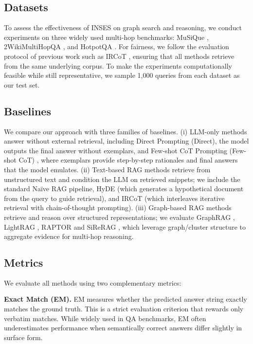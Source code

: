 \documentclass{article}
\theoremstyle{plain}
\theoremstyle{definition}
\theoremstyle{remark}
\begin{document}
\subsection{Datasets}
To assess the effectiveness of INSES on graph search and reasoning, we conduct experiments on three widely used multi-hop benchmarks: MuSiQue \citep{trivedi2022musique}, 2WikiMultiHopQA \citep{ho2020constructing}, and HotpotQA \citep{yang2018hotpotqa}. For fairness, we follow the evaluation protocol of previous work such as IRCoT \citep{trivedi2023interleaving}, ensuring that all methods retrieve from the same underlying corpus. To make the experiments computationally feasible while still representative, we sample 1,000 queries from each dataset as our test set. 

\subsection{Baselines}

We compare our approach with three families of baselines. (i) LLM-only methods answer without external retrieval, including Direct Prompting (Direct), the model outputs the final answer without exemplars, and Few-shot CoT Prompting (Few-shot CoT) \citep{wei2022chain}, where exemplars provide step-by-step rationales and final answers that the model emulates. (ii) Text-based RAG methods retrieve from unstructured text and condition the LLM on retrieved snippets; we include the standard Naïve RAG pipeline, HyDE \citep{gao2023precise} (which generates a hypothetical document from the query to guide retrieval), and IRCoT \citep{trivedi2023interleaving} (which interleaves iterative retrieval with chain-of-thought prompting). (iii) Graph-based RAG methods retrieve and reason over structured representations; we evaluate GraphRAG \citep{edge2024local}, LightRAG \citep{guo2024lightrag}, RAPTOR\citep{sarthi2024raptor} and SiReRAG \citep{zhangsirerag}, which leverage graph/cluster structure to aggregate evidence for multi-hop reasoning.

\subsection{Metrics}
We evaluate all methods using two complementary metrics:

\textbf{Exact Match (EM).}
EM measures whether the predicted answer string exactly matches the ground truth. This is a strict evaluation criterion that rewards only verbatim matches. While widely used in QA benchmarks, EM often underestimates performance when semantically correct answers differ slightly in surface form.
\end{document}
